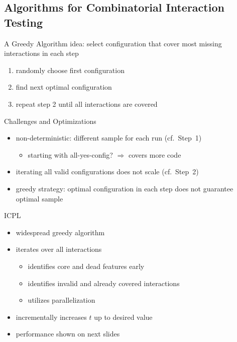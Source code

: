 \subsection{Algorithms for Combinatorial Interaction Testing}
\begin{frame}{\myframetitle{} }
	\begin{fancycolumns}[widths={63}]
		\begin{definition}{A Greedy Algorithm}
			idea: select configuration that cover most missing interactions in each step
			\begin{enumerate}
				\item randomly choose first configuration
				\item find next optimal configuration
				\item repeat step 2 until all interactions are covered
			\end{enumerate}
		\end{definition}
		\pause
		\begin{note}{Challenges and Optimizations}
			\begin{itemize}
				\item non-deterministic: different sample for each run (cf.\ Step~1)
				\begin{itemize}
					\item starting with all-yes-config? $\Rightarrow$ covers more code
				\end{itemize}
				\item iterating all valid configurations does not scale (cf.\ Step~2)
				\item greedy strategy: optimal configuration in each step does not guarantee optimal sample
			\end{itemize}
		\end{note}
	\nextcolumn
		\pause
		\begin{definition}{ICPL\mysource{\icpl}}
			\begin{itemize}
				\item widespread greedy algorithm
				\item iterates over all interactions
				\begin{itemize}
					\item identifies core and dead features early
					\item identifies invalid and already covered interactions
					\item utilizes parallelization
				\end{itemize}
				\item incrementally increases $t$ up to desired value
				\item performance shown on next slides
			\end{itemize}
		\end{definition}
	\end{fancycolumns}
\end{frame}

